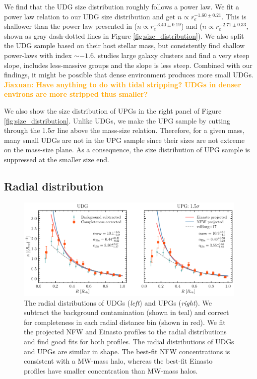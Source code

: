 \documentclass[twocolumn,astrosymb,twocolappendix]{aastex631}
\newcommand{\jiaxuan}[1]{\textcolor{orange}{\textbf{Jiaxuan: #1}}}
\begin{document}
\begin{CJK*}{UTF8}{gbsn}
We find that the UDG size distribution roughly follows a power law. We fit a power law relation to our UDG size distribution and get $n\propto r_e^{-1.60\pm0.21}$. This is shallower than the power law presented in \citet{vdBurg2016} ($n\propto r_e^{-3.40\pm0.19}$) and \citet{vdBurg2017} ($n\propto r_e^{-2.71\pm0.33}$, shown as gray dash-dotted lines in Figure \ref{fig:size_distribution}). We also split the UDG sample based on their host stellar mass, but consistently find shallow power-laws with index $\sim -1.6$. \citet{vdBurg2016} studies large galaxy clusters and find a very steep slope, \citet{vdBurg2017} includes less-massive groups and the slope is less steep. Combined with our findings, it might be possible that dense environment produces more small UDGs. \jiaxuan{Have anything to do with tidal stripping? UDGs in denser environs are more stripped thus smaller?}

We also show the size distribution of UPGs in the right panel of Figure \ref{fig:size_distribution}. Unlike UDGs, we make the UPG sample by cutting through the 1.5$\sigma$ line above the mass-size relation. Therefore, for a given mass, many small UDGs are not in the UPG sample since their sizes are not extreme on the mass-size plane. As a consequence, the size distribution of UPG sample is suppressed at the smaller size end. 

\subsection{Radial distribution}\label{sec:radial_distr}

\begin{figure}
	\vbox{ 
		\centering
		\includegraphics[width=1\linewidth]{radial_distribution.pdf}
	}
    \caption{The radial distributions of UDGs (\textit{left}) and UPGs (\textit{right}). We subtract the background contamination (shown in teal) and correct for completeness in each radial distance bin (shown in red). We fit the projected NFW and Einasto profiles to the radial distributions and find good fits for both profiles. The radial distributions of UDGs and UPGs are similar in shape. The best-fit NFW concentrations is consistent with a MW-mass halo, whereas the best-fit Einasto profiles have smaller concentration than MW-mass halos.}
    \label{fig:radial_distribution}
\end{figure}



\end{CJK*}
\end{document}
